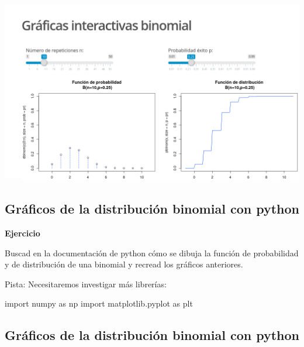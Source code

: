 \documentclass[]{book}
\newenvironment{Shaded}{\begin{snugshade}}{\end{snugshade}}
\newcommand{\ImportTok}[1]{#1}
\newcommand{\NormalTok}[1]{#1}
\begin{document}
\href{https://joanby.shinyapps.io/DistribucionesNotables/}{\includegraphics{Images/noshinyImages/interactiva_bino1.png}}

\hypertarget{gruxe1ficos-de-la-distribuciuxf3n-binomial-con-python}{%
\subsection{Gráficos de la distribución binomial con python}\label{gruxe1ficos-de-la-distribuciuxf3n-binomial-con-python}}

\textbf{Ejercicio}

Buscad en la documentación de python cómo se dibuja la función de probabilidad y de distribución de una binomial y recread los gráficos anteriores.

Pista: Necesitaremos investigar más librerías:

\begin{Shaded}
\begin{Highlighting}[]
\ImportTok{import}\NormalTok{ numpy }\ImportTok{as}\NormalTok{ np}
\ImportTok{import}\NormalTok{ matplotlib.pyplot }\ImportTok{as}\NormalTok{ plt}
\end{Highlighting}
\end{Shaded}

\hypertarget{gruxe1ficos-de-la-distribuciuxf3n-binomial-con-python-1}{%
\subsection{Gráficos de la distribución binomial con python}\label{gruxe1ficos-de-la-distribuciuxf3n-binomial-con-python-1}}
\end{document}
